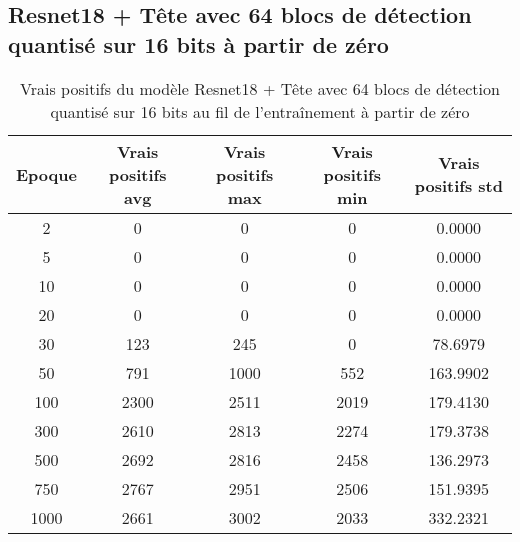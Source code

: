
\clearpage
\subsection{Resnet18 + Tête avec 64 blocs de détection quantisé sur 16 bits à partir de zéro}
\label{appendix:qresnet18_16b_fs}

\begin{table}[!ht]
    \caption{Vrais positifs du modèle Resnet18 + Tête avec 64 blocs de détection quantisé sur 16 bits au fil de l'entraînement à partir de zéro}
    \label{tab:qresnet18+head_64n_true_positive_16b_from_scratch}
    \centering
    \begin{tabular}{ |c||c|c|c|c|  }
        \hline
        \rowcolor{gray!50}
        Epoque & Vrais positifs avg & Vrais positifs max & Vrais positifs min & Vrais positifs std\\
        \hline
        2 & 0 & 0 & 0 & 0.0000\\
        5 & 0 & 0 & 0 & 0.0000\\
        10 & 0 & 0 & 0 & 0.0000\\
        20 & 0 & 0 & 0 & 0.0000\\
        30 & 123 & 245 & 0 & 78.6979\\
        50 & 791 & 1000 & 552 & 163.9902\\
        100 & 2300 & 2511 & 2019 & 179.4130\\
        300 & 2610 & 2813 & 2274 & 179.3738\\
        500 & 2692 & 2816 & 2458 & 136.2973\\
        750 & 2767 & 2951 & 2506 & 151.9395\\
        1000 & 2661 & 3002 & 2033 & 332.2321\\
        \hline
    \end{tabular}
\end{table}

